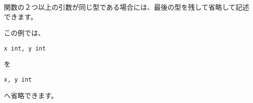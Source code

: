 関数の２つ以上の引数が同じ型である場合には、最後の型を残して省略して記述できます。

この例では、
\begin{lstlisting}[firstnumber=5]
x int, y int
\end{lstlisting}
を

\begin{lstlisting}[firstnumber=5]
x, y int
\end{lstlisting}
へ省略できます。